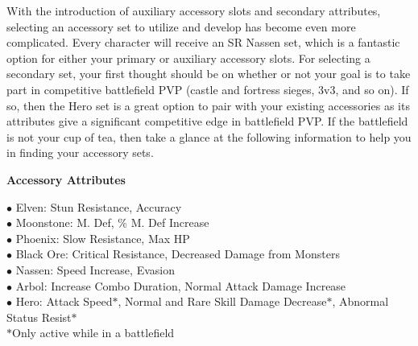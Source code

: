 \documentclass[]{article}
\begin{document}
With the introduction of auxiliary accessory slots and secondary attributes, selecting an accessory set to utilize and develop has become even more complicated.
Every character will receive an SR Nassen set, which is a fantastic option for either your primary or auxiliary accessory slots.
For selecting a secondary set, your first thought should be on whether or not your goal is to take part in competitive battlefield PVP (castle and fortress sieges, 3v3, and so on).
If so, then the Hero set is a great option to pair with your existing accessories as its attributes give a significant competitive edge in battlefield PVP.
If the battlefield is not your cup of tea, then take a glance at the following information to help you in finding your accessory sets.
\\
\begin{center}
	\textbf{Accessory Attributes}
\end{center}
$\bullet$ Elven: Stun Resistance, Accuracy\\
$\bullet$ Moonstone: M. Def, \% M. Def Increase\\
$\bullet$ Phoenix: Slow Resistance, Max HP\\
$\bullet$ Black Ore: Critical Resistance, Decreased Damage from Monsters\\
$\bullet$ Nassen: Speed Increase, Evasion\\
$\bullet$ Arbol: Increase Combo Duration, Normal Attack Damage Increase\\
$\bullet$ Hero: Attack Speed$*$, Normal and Rare Skill Damage Decrease$*$, Abnormal Status Resist$*$\\
$*$Only active while in a battlefield
\end{document}
